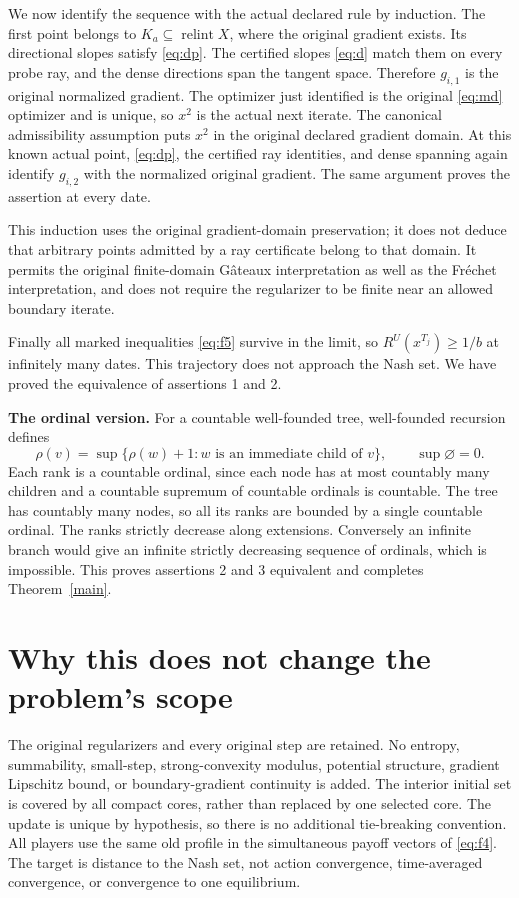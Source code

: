 \documentclass[11pt,a4paper]{article}
\newcommand{\ri}{\operatorname{relint}}
\begin{document}
We now identify the sequence with the actual declared rule by induction.
The first point belongs to \(K_a\subseteq\ri X\), where the original gradient
exists. Its directional slopes satisfy \eqref{eq:dp}. The certified slopes \eqref{eq:d} match
them on every probe ray, and the dense directions span the tangent space.
Therefore \(g_{i,1}\) is the original normalized gradient. The optimizer
just identified is the original \eqref{eq:md} optimizer and is unique, so \(x^2\)
is the actual next iterate. The canonical admissibility assumption puts
\(x^2\) in the original declared gradient domain. At this known actual point,
\eqref{eq:dp}, the certified ray identities, and dense spanning again identify
\(g_{i,2}\) with the normalized original gradient. The same argument proves
the assertion at every date.

This induction uses the original gradient-domain preservation; it does not
deduce that arbitrary points admitted by a ray certificate belong to that
domain. It permits the original finite-domain G\^ateaux interpretation as well
as the Fr\'echet interpretation, and does not require the regularizer to be
finite near an allowed boundary iterate.

Finally all marked inequalities \eqref{eq:f5} survive in the limit, so
\(R^U(x^{T_j})\ge1/b\) at infinitely many dates. This trajectory does not
approach the Nash set. We have proved the equivalence of assertions 1 and 2.

\textbf{The ordinal version.}
For a countable well-founded tree, well-founded recursion defines
\[
\rho(v)=\sup\{\rho(w)+1:w\text{ is an immediate child of }v\},
\qquad \sup\varnothing=0.
\]
Each rank is a countable ordinal, since each node has at most countably many
children and a countable supremum of countable ordinals is countable.
The tree has countably many nodes, so all its ranks are bounded by a single
countable ordinal. The ranks strictly decrease along extensions. Conversely
an infinite branch would give an infinite strictly decreasing sequence of
ordinals, which is impossible. This proves assertions 2 and 3 equivalent and
completes Theorem~\ref{main}.

\section{Why this does not change the problem's scope}

The original regularizers and every original step are retained. No entropy,
summability, small-step, strong-convexity modulus, potential structure, gradient
Lipschitz bound, or boundary-gradient continuity is added. The interior initial
set is covered by all compact cores, rather than replaced by one selected core.
The update is unique by hypothesis, so there is no additional tie-breaking
convention. All players use the same old profile in the simultaneous payoff
vectors of \eqref{eq:f4}. The target is distance to the Nash set, not action convergence,
time-averaged convergence, or convergence to one equilibrium.
\end{document}
